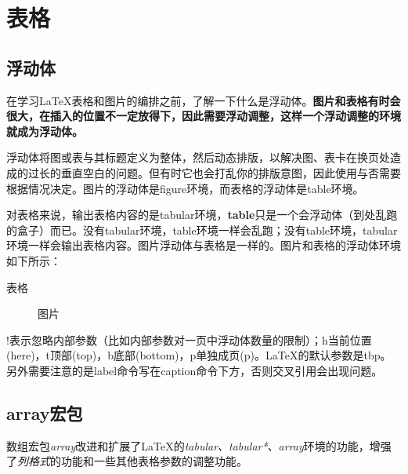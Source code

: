 \newpage
\chapter{表格}
\thispagestyle{chapterpage}

\section{浮动体}

在学习\LaTeX{}表格和图片的编排之前，了解一下什么是浮动体。\textbf{图片和表格有时会很大，在插入的位置不一定放得下，因此需要浮动调整，这样一个浮动调整的环境就成为浮动体。}


浮动体将图或表与其标题定义为整体，然后动态排版，以解决图、表卡在换页处造成的过长的垂直空白的问题。但有时它也会打乱你的排版意图，因此使用与否需要根据情况决定。图片的浮动体是figure环境，而表格的浮动体是table环境。

对表格来说，输出表格内容的是tabular环境，\textbf{table}只是一个会浮动体（到处乱跑的盒子）而已。没有tabular环境，table环境一样会乱跑；没有table环境，tabular环境一样会输出表格内容。图片浮动体与表格是一样的。图片和表格的浮动体环境如下所示：

\begin{latex}
\begin{table}[!htbp]
表格
\end{table}
\begin{figure}[!htbp]
图片
\end{figure}
\end{latex}

!表示忽略内部参数（比如内部参数对一页中浮动体数量的限制）；h当前位置(here)，t顶部(top)，b底部(bottom)，p单独成页(p)。\LaTeX{}的默认参数是tbp。另外需要注意的是label命令写在caption命令下方，否则交叉引用会出现问题。

\section{array宏包}

数组宏包\emph{array}改进和扩展了\LaTeX 的\emph{tabular、tabular*、array}环境的功能，增强了\emph{列格式}的功能和一些其他表格参数的调整功能。

